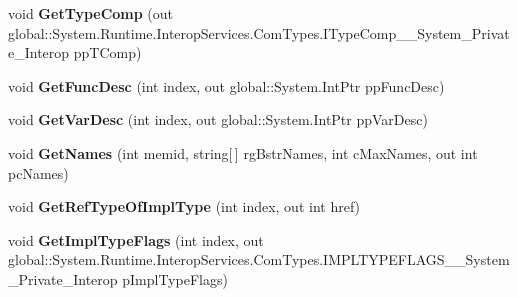 \begin{DoxyCompactItemize}
void {\bfseries Get\+Type\+Comp} (out global\+::\+System.\+Runtime.\+Interop\+Services.\+Com\+Types.\+I\+Type\+Comp\+\_\+\+\_\+\+System\+\_\+\+Private\+\_\+\+Interop pp\+T\+Comp)
\item 
\mbox{\label{interface_system_1_1_runtime_1_1_interop_services_1_1_com_types_1_1_i_type_info_____system___private___interop_aad5ee60703eb42da04c249d933de9372}} 
void {\bfseries Get\+Func\+Desc} (int index, out global\+::\+System.\+Int\+Ptr pp\+Func\+Desc)
\item 
\mbox{\label{interface_system_1_1_runtime_1_1_interop_services_1_1_com_types_1_1_i_type_info_____system___private___interop_a6864af0a73b4667a1b3ff9f71a65f317}} 
void {\bfseries Get\+Var\+Desc} (int index, out global\+::\+System.\+Int\+Ptr pp\+Var\+Desc)
\item 
\mbox{\label{interface_system_1_1_runtime_1_1_interop_services_1_1_com_types_1_1_i_type_info_____system___private___interop_a161d5d3ddd1aa44629b27be7d6caaee7}} 
void {\bfseries Get\+Names} (int memid, string\mbox{[}$\,$\mbox{]} rg\+Bstr\+Names, int c\+Max\+Names, out int pc\+Names)
\item 
\mbox{\label{interface_system_1_1_runtime_1_1_interop_services_1_1_com_types_1_1_i_type_info_____system___private___interop_a6589519f0c86fa462b9a03ab2a78b59d}} 
void {\bfseries Get\+Ref\+Type\+Of\+Impl\+Type} (int index, out int href)
\item 
\mbox{\label{interface_system_1_1_runtime_1_1_interop_services_1_1_com_types_1_1_i_type_info_____system___private___interop_ae5c606ba7b1dd1ba41edfa764de5bf7f}} 
void {\bfseries Get\+Impl\+Type\+Flags} (int index, out global\+::\+System.\+Runtime.\+Interop\+Services.\+Com\+Types.\+I\+M\+P\+L\+T\+Y\+P\+E\+F\+L\+A\+G\+S\+\_\+\+\_\+\+System\+\_\+\+Private\+\_\+\+Interop p\+Impl\+Type\+Flags)

\end{DoxyCompactItemize}
